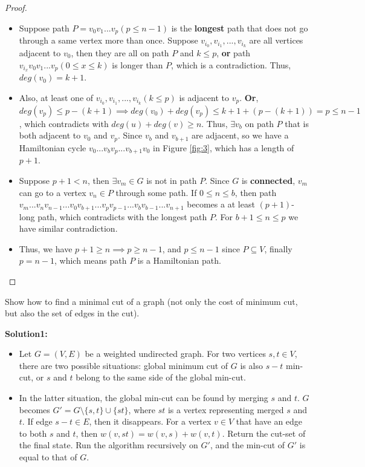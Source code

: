 \documentclass{article}
\newcounter{exercise}
\newcommand{\<}{
    \langle}
\renewcommand{\>}{
    \rangle}
\begin{document}
{\begin{proof}
\begin{itemize}
        \item Suppose path $P=v_0 v_1 ... v_p(p\leq n-1)$ is the \textbf{longest} path that does not go through a same vertex more than once. Suppose $v_{i_0},v_{i_1},...,v_{i_k}$ are all vertices adjacent to $v_0$, then they are all on path $P$ and $k\leq p$, \textbf{or} path $v_{i_x}v_0v_1...v_p(0\leq x\leq k)$ is longer than $P$, which is a contradiction. Thus, $deg(v_0)=k+1$.
        
        \item Also, at least one of $v_{i_0},v_{i_1},...,v_{i_k} (k\leq p)$ is adjacent to $v_p$. \textbf{Or}, $deg(v_p)\leq p-(k+1)\implies deg(v_0)+deg(v_p)\leq k+1+(p-(k+1))=p\leq n-1$, which contradicts with $deg(u)+deg(v) \geq n$. Thus, $\exists v_b$ on path $P$ that is both adjacent to $v_0$ and $v_p$. Since $v_b$ and $v_{b+1}$ are adjacent, so we have a Hamiltonian cycle $v_0 ... v_b v_p ... v_{b+1} v_0$ in Figure \ref{fig:3}, which has a length of $p+1$.
        
        \item Suppose $p+1 < n$, then $\exists v_m \in G$ is not in path $P$. Since $G$ is \textbf{connected}, $v_m$ can go to a vertex $v_n\in P$ through some path. If $0\leq n\leq b$, then path $v_m ... v_n v_{n-1} ... v_0 v_{b+1} ... v_{p} v_{p-1} ... v_{b} v_{b-1} ... v_{n+1}$ becomes a at least $(p+1)$-long path, which contradicts with the longest path $P$. For $b+1\leq n\leq p$ we have similar contradiction. 
        \item Thus, we have $p+1 \geq n\implies p\geq n-1$, and $p \leq n-1$ since $P \subseteq V$, finally $p=n-1$, which means path $P$ is a Hamiltonian path.
    \end{itemize}
    
\end{proof}




\begin{exercise}
Show how to find a minimal cut of a graph (not only the cost of minimum cut, but also the set of edges in the cut).
\end{exercise}

\textbf{Solution1:}

    \begin{itemize}
        \item Let $G=(V,E)$ be a weighted undirected graph. For two vertices $s,t\in V$, there are two possible situations: global minimum cut of $G$ is also $s-t$ min-cut, or $s$ and $t$ belong to the same side of the global min-cut.
        \item In the latter situation, the global min-cut can be found by merging $s$ and $t$. $G$ becomes $G'=G\setminus \{s,t\}\cup \{st\}$, where $st$ is a vertex representing merged $s$ and $t$. If edge $s-t\in E$, then it disappears. For a vertex $v\in V$ that have an edge to both $s$ and $t$, then $w(v,st)=w(v,s)+w(v,t)$. Return the cut-set of the final state. Run the algorithm recursively on $G'$, and the min-cut of $G'$ is equal to that of $G$.
        

\end{itemize}}
\end{document}
